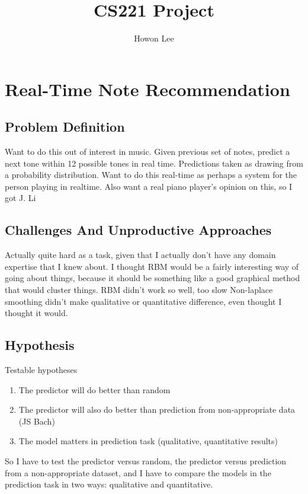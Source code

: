 \documentclass{article}
\begin{document}
\title{CS221 Project}
\author{Howon Lee}
\maketitle
\section*{Real-Time Note Recommendation}

\subsection*{Problem Definition}
Want to do this out of interest in music.
Given previous set of notes, predict a next tone within 12 possible tones in real time.
Predictions taken as drawing from a probability distribution.
Want to do this real-time as perhaps a system for the person playing in realtime.
Also want a real piano player's opinion on this, so I got J. Li

\subsection*{Challenges And Unproductive Approaches}
Actually quite hard as a task, given that I actually don't have any domain expertise that I knew about.
I thought RBM would be a fairly interesting way of going about things, because it should be something like a good graphical method that would cluster things. RBM didn't work so well, too slow
Non-laplace smoothing didn't make qualitative or quantitative difference, even thought I thought it would.

\subsection*{Hypothesis}
Testable hypotheses
\begin{enumerate}
    \item The predictor will do better than random
    \item The predictor will also do better than prediction from non-appropriate data (JS Bach)
    \item The model matters in prediction task (qualitative, quantitative results)
\end{enumerate}
So I have to test the predictor versus random, the predictor versus prediction from a non-appropriate dataset, and I have to compare the models in the prediction task in two ways: qualitative and quantitative.
\end{document}

